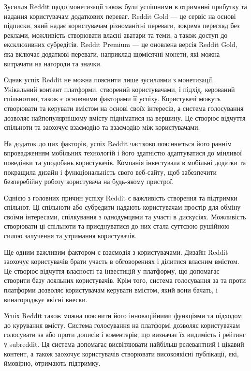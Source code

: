 \documentclass[oneside,14pt]{extarticle}
\begin{document}
Зусилля Reddit щодо монетизації також були успішними в отриманні прибутку та надання користувачам додаткових переваг. Reddit Gold — це сервіс на основі підписки, який надає користувачам різноманітні переваги, зокрема перегляд без реклами, можливість створювати власні аватари та теми, а також доступ до ексклюзивних субредітів. Reddit Premium — це оновлена версія Reddit Gold, яка включає додаткові переваги, наприклад щомісячні монети, які можна витрачати на нагороди та значки.

Однак успіх Reddit не можна пояснити лише зусиллями з монетизації. Унікальний контент платформи, створений користувачами, і підхід, керований спільнотою, також є основними факторами її успіху. Користувачі можуть створювати та керувати вмістом на основі своїх інтересів, а система голосування дозволяє найпопулярнішому вмісту підніматися на вершину. Це створює відчуття спільноти та заохочує взаємодію та взаємодію між користувачами.

На додаток до цих факторів, успіх Reddit частково пояснюється його раннім впровадженням мобільних технологій і його здатністю адаптуватися до мінливої поведінки та уподобань користувачів. Компанія інвестувала в мобільні додатки та покращила дизайн і функціональність свого веб-сайту, щоб забезпечити безперебійну роботу користувача на будь-якому пристрої.

Однією з головних причин успіху Reddit є важливість створення та підтримки спільнот. Ці спільноти або субредити надають користувачам простір для обміну своїми інтересами, спілкування з однодумцями та участі в дискусіях. Можливість створювати ці спільноти та приєднуватися до них стала суттєвою рушійною силою залучення та утримання користувачів.

Ще одним важливим фактором є взаємодія з користувачами. Дизайн Reddit заохочує користувачів брати участь в обговореннях і ділитися власним вмістом. Це створює відчуття власності та інвестицій у платформу, що допомагає створити базу лояльних користувачів. Крім того, система голосування за та проти платформи дозволяє користувачам керувати вмістом, який вони бачать, і винагороджує якісні внески.

Успіх Reddit також можна пояснити його інноваційними функціями та підходом до курування вмісту. Система голосування на платформі дозволяє користувачам голосувати за або проти дописів і коментарів, що визначає їх видимість і рейтинг у subreddit. Ця система допомагає висвітлювати найбільш релевантний і цікавий контент, а також заохочує користувачів створювати високоякісні публікації, які, ймовірно, отримають підтримку.
\end{document}
